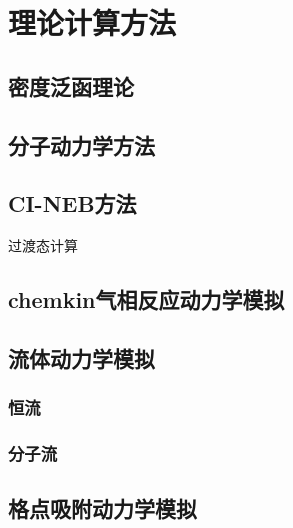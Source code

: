 \chapter{理论计算方法}
\section{密度泛函理论}
\section{分子动力学方法}
\section{CI-NEB方法}
    过渡态计算
\section{chemkin气相反应动力学模拟}
\section{流体动力学模拟}
    \subsection{恒流}
    \subsection{分子流}
\section{格点吸附动力学模拟}
